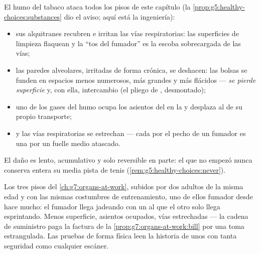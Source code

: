 \begin{proposition}\label{prop:g7:lungs-and-gas-exchange:smoke}
El humo del tabaco ataca todos los pisos de este capítulo (la
\cref{prop:g5:healthy-choices:substances} dio el aviso; aquí está la
ingeniería):
\begin{itemize}
  \item sus alquitranes recubren e irritan las vías respiratorias: las
        superficies de limpieza flaquean y la ``tos del fumador'' es la
        escoba sobrecargada de las vías;
  \item las paredes alveolares, irritadas de forma crónica, se
        deshacen: las bolsas se funden en espacios menos numerosos, más
        grandes y más flácidos --- \emph{se pierde superficie} y, con
        ella, intercambio (el pliego de , desmontado);
  \item uno de los gases del humo ocupa los asientos del  en la
         y desplaza al  de su propio transporte;
  \item y las vías respiratorias se estrechan --- cada  por
        el pecho de un fumador es una  por un fuelle medio
        atascado.
\end{itemize}
El daño es lento, acumulativo y solo reversible en parte: el  que
no empezó nunca conserva entera su media pista de tenis
(\cref{rem:g5:healthy-choices:never}).
\end{proposition}
\admitted

\begin{example}\label{ex:g7:lungs-and-gas-exchange:stairs}
Los tres pisos del \cref{ch:g7:organs-at-work}, subidos por dos adultos
de la misma edad y con las mismas costumbres de entrenamiento, uno de
ellos fumador desde hace mucho: el fumador llega jadeando con un 
al que el otro solo llega esprintando. Menos superficie, asientos
ocupados, vías estrechadas --- la cadena de suministro paga la factura
de la \cref{prop:g7:organs-at-work:bill} por una toma estrangulada. Las
pruebas de forma física leen la historia de unos  con tanta
seguridad como cualquier escáner.
\end{example}

